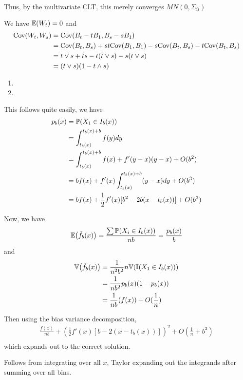\begin{exercises}
\begin{enumerate}
      Thus, by the multivariate CLT, this merely converges $MN(0, \Sigma_{ii})$
  \end{enumerate}
\item
  We have $\E{W_{t}} = 0$ and
  \begin{align}
    \label{eq:12}
    \Cov{W_{t}}{W_{s}} &= \Cov{B_{t} - t B_{1}}{B_{s} - s B_{1}} \\
    &= \Cov{B_{t}}{B_{s}} + st\Cov{B_{1}}{B_{1}} - s \Cov{B_{t}}{B_{s}} - t \Cov{B_{t}}{B_{s}} \\
    &= t \vee s + ts - t(t \vee s) - s(t \vee s) \\
    &= (t \vee s)(1 - t \wedge s)
  \end{align}
\item
  \begin{enumerate}
  \item {}
  \item {}
  \end{enumerate}
\item
\item
  This follows quite easily, we have
  \begin{align}
    \label{eq:13}
    p_{b}(x) &= \Prob{X_{1} \in I_{b}(x)} \\
    &= \int_{t_{b}(x)}^{t_{b}(x) + b} f(y) dy \\
    &= \int_{t_{b}(x)}^{t_{b}(x) + b} f(x) + f'(y-x)(y-x) + O(b^{2}) \\
    &= bf(x) + f'(x) \int_{t_{b}(x)}^{t_{b}(x) + b} (y-x) dy +
    O(b^{3}) \\
    &= bf(x) + \frac{1}{2} f'(x)[b^{2} - 2b(x - t_{b}(x))] + O(b^{3})
  \end{align}

  Now, we have
  \begin{align}
    \label{eq:14}
    \E{\tilde f_{b}(x)} = \frac{\sum \Prob{X_{i} \in I_{b}(x)}}{nb} = \frac{p_{b}(x)}{b}
  \end{align} and
  \begin{align}
    \label{eq:15}
    \Var{\tilde f_{b}(x)} &= \frac{1}{n^{2}b^{2}} n \Var{\I{X_{1} \in
        I_{b}(x)}} \\
    &= \frac{1}{nb^{2}} p_{b}(x) (1-p_{b}(x)) \\
    &= \frac{1}{nb}(f(x)) + O(\frac{1}{n})
  \end{align}

  Then using the bias variance decomposition,
  \begin{align}
    \label{eq:16}
    \frac{f(x)}{nb} + \left(\frac{1}{2} f'(x)[b - 2(x -
      t_{b}(x))]\right)^{2} + O(\frac{1}{n} + b^{3}) \\
  \end{align} which expands out to the correct solution.
\item
  Follows from integrating over all $x$, Taylor expanding out the
  integrands after summing over all bins.


\end{exercises}

